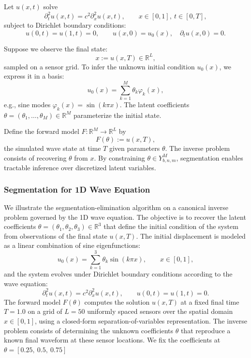 \documentclass[aps,twocolumn,superscriptaddress,nofootinbib]{revtex4}
\begin{document}
Let $u(x,t)$ solve
\begin{equation}
    \partial_t^2 u(x,t) = c^2 \partial_x^2 u(x,t), \qquad x \in [0,1],\ t \in [0,T],
\end{equation}
subject to Dirichlet boundary conditions:
\begin{equation}
    u(0,t) = u(1,t) = 0, \qquad u(x,0) = u_0(x), \quad \partial_t u(x,0) = 0.
\end{equation}

Suppose we observe the final state:
\begin{equation}
    x := u(x,T) \in \mathbb{R}^L,
\end{equation}
sampled on a sensor grid. To infer the unknown initial condition $u_0(x)$, we express it in a basis:
\begin{equation}
    u_0(x) = \sum_{k=1}^M \theta_k \varphi_k(x),
\end{equation}
e.g., sine modes $\varphi_k(x) = \sin(k\pi x)$. The latent coefficients $\theta = (\theta_1, \ldots, \theta_M) \in \mathbb{R}^M$ parameterize the initial state.

Define the forward model $F: \mathbb{R}^M \to \mathbb{R}^L$ by
\begin{equation}
    F(\theta) := u(x,T),
\end{equation}
the simulated wave state at time $T$ given parameters $\theta$. The inverse problem consists of recovering $\theta$ from $x$. By constraining $\theta \in Y^M_{b,n,m}$, segmentation enables tractable inference over discretized latent variables.

\subsubsection{Segmentation for 1D Wave Equation}

We illustrate the segmentation-elimination algorithm on a canonical inverse problem governed by the 1D wave equation. The objective is to recover the latent coefficients \( \theta = (\theta_1, \theta_2, \theta_3) \in \mathbb{R}^3 \) that define the initial condition of the system from observations of the final state \( u(x, T) \). The initial displacement is modeled as a linear combination of sine eigenfunctions:
\[
u_0(x) = \sum_{k=1}^3 \theta_k \sin(k \pi x), \qquad x \in [0, 1],
\]
and the system evolves under Dirichlet boundary conditions according to the wave equation:
\[
\partial_t^2 u(x,t) = c^2 \partial_x^2 u(x,t), \qquad u(0,t) = u(1,t) = 0.
\]
The forward model \( F(\theta) \) computes the solution \( u(x,T) \) at a fixed final time \( T = 1.0 \) on a grid of \( L = 50 \) uniformly spaced sensors over the spatial domain \( x \in [0, 1] \), using a closed-form separation-of-variables representation. The inverse problem consists of determining the unknown coefficients \( \theta \) that reproduce a known final waveform at these sensor locations. We fix the coefficients at $\theta = [0.25,\ 0.5,\ 0.75]$
\end{document}
